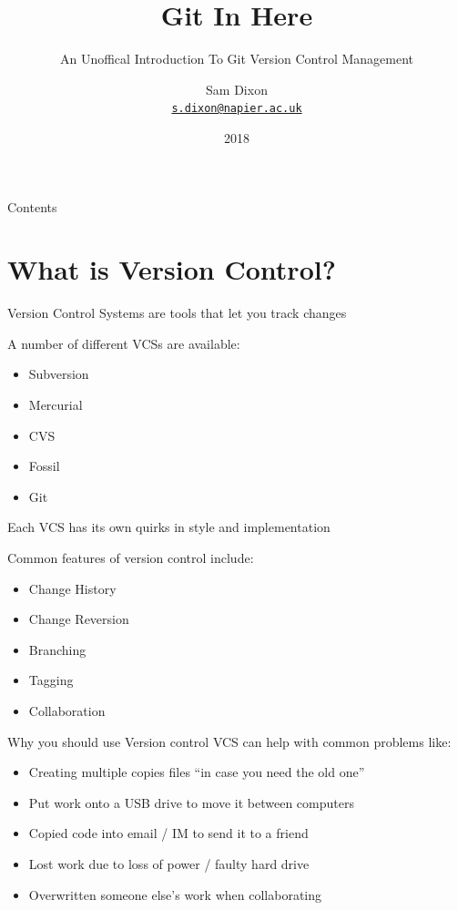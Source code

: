 \documentclass{beamer}
\title{Git In Here}
\subtitle{An Unoffical Introduction To Git Version Control Management}
\author{Sam Dixon\\
{\tt \href{mailto:s.dixon@napier.ac.uk}{s.dixon@napier.ac.uk}}}
\date{2018}
\begin{document}
\frame{\titlepage}


\begin{frame}{Contents}
    \tableofcontents
\end{frame}


\section{What is Version Control?}
\begin{frame}[allowframebreaks]{\secname}
    Version Control Systems are tools that let you track changes    
    
    A number of different VCSs are available:
    \begin{itemize}
    \item Subversion
    \item Mercurial
    \item CVS
    \item Fossil
    \item Git
    \end{itemize}
    Each VCS has its own quirks in style and implementation 

\framebreak

    Common features of version control include:
    \begin{itemize}
    \item Change History
    \item Change Reversion  
    \item Branching
    \item Tagging
    \item Collaboration
    \end{itemize}
\end{frame}


\begin{frame}{Why you should use Version control}
    VCS can help with common problems like:

    \begin{itemize}
    \item Creating multiple copies files ``in case you need the old one''
    \item Put work onto a USB drive to move it between computers
    \item Copied code into email / IM to send it to a friend
    \item Lost work due to loss of power / faulty hard drive
    \item Overwritten someone else's work when collaborating
    \end{itemize}
\end{frame}
\end{document}
